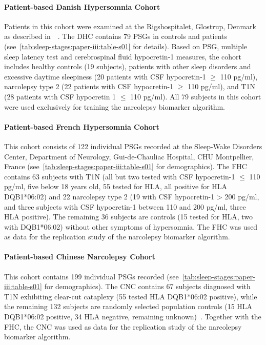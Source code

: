 \paragraph{Patient-based Danish Hypersomnia Cohort}
Patients in this cohort were examined at the Rigshospitalet, Glostrup, Denmark as described in~\citeauthor{Christensen2017}~\cite{Christensen2017}.
The DHC contains 79 \acp{PSG} in controls and patients (see~\cref{tab:sleep-stages:paper-iii:table-s01} for details).
Based on \ac{PSG}, multiple sleep latency test and cerebrospinal fluid hypocretin-1 measures, the cohort includes healthy controls (19 subjects), patients with other sleep disorders and excessive daytime sleepiness (20 patients with CSF hypocretin-1 $\geq$ 110 pg/ml), narcolepsy type 2 (22 patients with CSF hypocretin-1 $\geq$ 110 pg/ml), and T1N (28 patients with CSF hypocretin 1 $\leq$ 110 pg/ml).
All 79 subjects in this cohort were used exclusively for training the narcolepsy biomarker algorithm.

\paragraph{Patient-based French Hypersomnia Cohort}
This cohort consists of 122 individual \acp{PSG} recorded at the Sleep-Wake Disorders Center, Department of Neurology, Gui-de-Chauliac Hospital, CHU Montpellier, France (see~\cref{tab:sleep-stages:paper-iii:table-s01} for demographics).
The FHC contains 63 subjects with T1N (all but two tested with CSF hypocretin-1 $\leq$ 110 pg/ml, five below 18 years old, 55 tested for HLA, all positive for HLA DQB1*06:02) and 22 narcolepsy type 2 (19 with CSF hypocretin-1 > 200 pg/ml, and three subjects with CSF hypocretin-1 between 110 and 200 pg/ml, three HLA positive).
The remaining 36 subjects are controls (15 tested for HLA, two with DQB1*06:02) without other symptoms of hypersomnia.
The FHC was used as data for the replication study of the narcolepsy biomarker algorithm.

\paragraph{Patient-based Chinese Narcolepsy Cohort}
This cohort contains 199 individual \acp{PSG} recorded (see~\cref{tab:sleep-stages:paper-iii:table-s01} for demographics).
The CNC contains 67 subjects diagnosed with T1N exhibiting clear-cut cataplexy (55 tested HLA DQB1*06:02 positive), while the remaining 132 subjects are randomly selected population controls (15 HLA DQB1*06:02 positive, 34 HLA negative, remaining unknown)~\cite{Andlauer2012}.
Together with the FHC, the CNC was used as data for the replication study of the narcolepsy biomarker algorithm.

